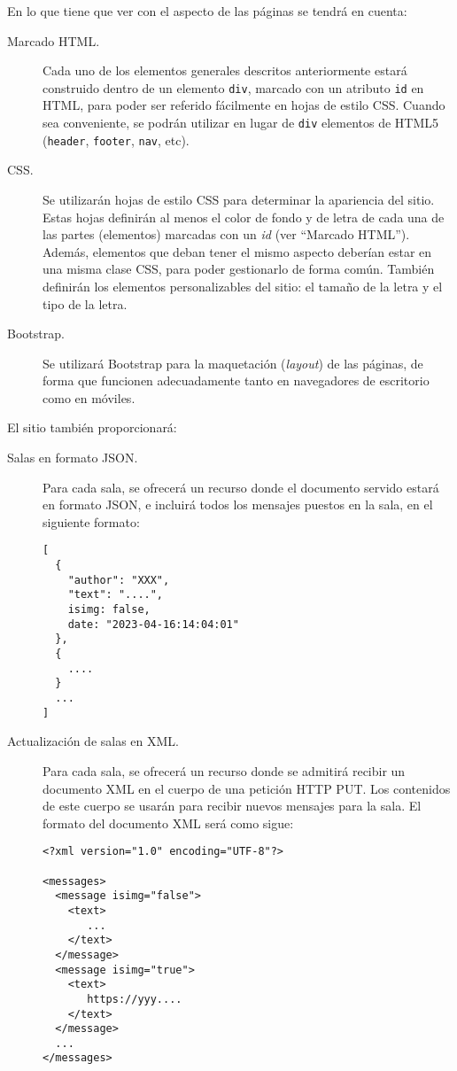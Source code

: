 En lo que tiene que ver con el aspecto de las páginas se tendrá en cuenta:

\begin{description}
\item[Marcado HTML.] Cada uno de los elementos generales descritos anteriormente estará construido dentro de un elemento \texttt{div}, marcado con un atributo \texttt{id} en HTML, para poder ser referido fácilmente en hojas de estilo CSS. Cuando sea conveniente, se podrán utilizar en lugar de \texttt{div} elementos de HTML5 (\texttt{header}, \texttt{footer}, \texttt{nav}, etc).

\item[CSS.] Se utilizarán hojas de estilo CSS para determinar la apariencia del sitio. Estas hojas definirán al menos el color de fondo y de letra de cada una de las partes (elementos) marcadas con un \emph{id} (ver ``Marcado HTML''). Además, elementos que deban tener el mismo aspecto deberían estar en una misma clase CSS, para poder gestionarlo de forma común. También definirán los elementos personalizables del sitio: el tamaño de la letra y el tipo de la letra.

\item[Bootstrap.] Se utilizará Bootstrap para la maquetación (\emph{layout}) de las páginas, de forma que funcionen adecuadamente tanto en navegadores de escritorio como en móviles.
\end{description}

El sitio también proporcionará:

\begin{description}
\item[Salas en formato JSON.] Para cada sala, se ofrecerá un recurso donde el documento servido estará en formato JSON, e incluirá todos los mensajes puestos en la sala, en el siguiente formato:

\begin{verbatim}
[
  {
    "author": "XXX",
    "text": "....",
    isimg: false,
    date: "2023-04-16:14:04:01"
  },
  {
    ....
  }
  ...
]
\end{verbatim}

\item[Actualización de salas en XML.] Para cada sala, se ofrecerá un recurso donde se admitirá recibir un documento XML en el cuerpo de una petición HTTP PUT. Los contenidos de este cuerpo se usarán para recibir nuevos mensajes para la sala. El formato del documento XML será como sigue:

\begin{verbatim}
<?xml version="1.0" encoding="UTF-8"?>

<messages>
  <message isimg="false">
    <text>
       ...
    </text>
  </message>
  <message isimg="true">
    <text>
       https://yyy....
    </text>
  </message>
  ...
</messages>
\end{verbatim}

\end{description}


